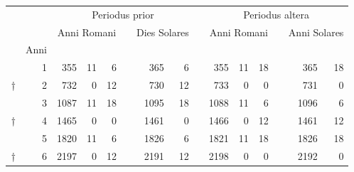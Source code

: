 %
\begin{tabnums} %
\normalsize
\centering
\setlength{\tabcolsep}{1.0ex}
%
\newcommand{\cwd}{3.2em}
\newcommand{\da}{{\tiny †}}
\newcommand{\db}{{\scriptsize o}}
\newcommand{\ang}{90}
\newcommand{\hsc}[1]{\small{#1}}
\newcommand{\hsb}[1]{\scriptsize{#1}}
\newcommand{\hsa}[1]{\tiny{#1}}
\newcommand{\hdrC}{%
  \multicolumn{6}{c}{\hsc{Periodus prior}} &
  &
  \multicolumn{6}{c}{\hsc{Periodus altera}}  
}
%
\newcommand{\hdrB}[1]{%
  \multicolumn{3}{c}{\hsb{Anni Romani}} &
  &
  \multicolumn{2}{c}{\hsb{#1 Solares}}  
}
%
\newcommand{\hdrA}{%
  \ch{8888}{\hsa{Dies collecti}} &
  \ch{8888}{\hsa{Dies superflui}}&
  \ch{881}{\hsa{Horae}} &
  &
  \ch{8888}{\hsa{Dies collecti}} &
  \ch{881}{\hsa{Horae}}
}
%
\newcommand{\hdrs}{%
 ~ & ~ & \hdrC \\
 ~ & ~ & \hdrB{Dies} & & \hdrB{Anni} \\
\cmidrule(lr){3-5} \cmidrule(lr){7-8} \cmidrule(lr){10-12} \cmidrule(lr){14-15}
 ~ & \hsa{Anni} & \hdrA & & \hdrA \\
}
%
\begin{tabular}[c]{@{} rr rrr c rr c rrr c rr @{}}
\toprule
\hdrs %
\midrule
~   &  1 &  355 & 11 &  6 &&  365 &  6 &&  355 & 11 & 18 &&  365 & 18 \\
\da &  2 &  732 &  0 & 12 &&  730 & 12 &&  733 &  0 &  0 &&  731 &  0 \\
~   &  3 & 1087 & 11 & 18 && 1095 & 18 && 1088 & 11 &  6 && 1096 &  6 \\
\da &  4 & 1465 &  0 &  0 && 1461 &  0 && 1466 &  0 & 12 && 1461 & 12 \\
~   &  5 & 1820 & 11 &  6 && 1826 &  6 && 1821 & 11 & 18 && 1826 & 18 \\
\da &  6 & 2197 &  0 & 12 && 2191 & 12 && 2198 &  0 &  0 && 2192 &  0 \\

\end{tabular}
\end{tabnums}
